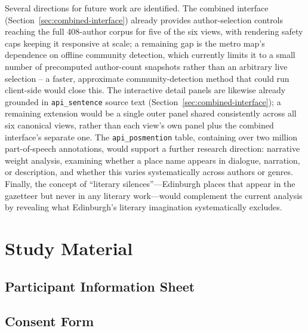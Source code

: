 \documentclass[logo,msc]{infthesis}
\begin{document}
Several directions for future work are identified. The combined interface (Section~\ref{sec:combined-interface}) already provides author-selection controls reaching the full 408-author corpus for five of the six views, with rendering safety caps keeping it responsive at scale; a remaining gap is the metro map's dependence on offline community detection, which currently limits it to a small number of precomputed author-count snapshots rather than an arbitrary live selection -- a faster, approximate community-detection method that could run client-side would close this. The interactive detail panels are likewise already grounded in \texttt{api\_sentence} source text (Section~\ref{sec:combined-interface}); a remaining extension would be a single outer panel shared consistently across all six canonical views, rather than each view's own panel plus the combined interface's separate one. The \texttt{api\_posmention} table, containing over two million part-of-speech annotations, would support a further research direction: narrative weight analysis, examining whether a place name appears in dialogue, narration, or description, and whether this varies systematically across authors or genres. Finally, the concept of ``literary silences''---Edinburgh places that appear in the gazetteer but never in any literary work---would complement the current analysis by revealing what Edinburgh's literary imagination systematically excludes.
 
 


 
 
\appendix
 
\chapter{Study Material}
 
\section{Participant Information Sheet}


\section{Consent Form}

 
\end{document}
